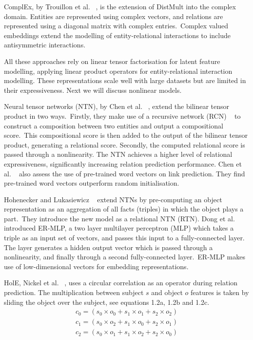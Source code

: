 \noindent ComplEx, by Trouillon et al. \unskip~\citep{trouillon2016complex}, is the extension of DistMult into the complex domain. Entities are represented using complex vectors, and relations are represented using a diagonal matrix with complex entries.\ Complex valued embeddings extend the modelling of entity-relational interactions to include antisymmetric interactions. \par

\noindent All these approaches rely on linear tensor factorisation for latent feature modelling, applying linear product operators for entity-relational interaction modelling. These representations scale well with large datasets but are limited in their expressiveness. Next we will discuss nonlinear models. \par

\noindent Neural tensor networks (NTN), by Chen et al. \unskip~\citep{socher2013reasoning}, extend the bilinear tensor product in two ways.\ Firstly, they make use of a recursive network (RCN) \unskip~\citep{socher2012semantic} to construct a composition between two entities and output a compositional score.\ This compositional score is then added to the output of the bilinear tensor product, generating a relational score. Secondly, the computed relational score is passed through a nonlinearity. The NTN achieves a higher level of relational expressiveness, significantly increasing relation prediction performance.  Chen et al. \unskip~\citep{socher2013reasoning} also assess the use of pre-trained word vectors on link prediction. They find pre-trained word vectors outperform random initialisation. \par

\noindent Hohenecker and Lukasiewicz \unskip~\citep{hohenecker2017deep} extend NTNs by pre-computing an object representation as an aggregation of all facts (triples) in which the object plays a part.\ They introduce the new model as a relational NTN (RTN). Dong et al. \unskip~\citep{dong2014knowledge} introduced ER-MLP, a two layer multilayer perceptron (MLP) which takes a triple as an input set of vectors, and passes this input to a fully-connected layer. The layer generates a hidden output vector which is passed through a nonlinearity, and finally through a second fully-connected layer.\ ER-MLP makes use of low-dimensional vectors for embedding representations. \par

\noindent HolE, Nickel et al. \unskip~\citep{nickel2016holographic}, uses a circular correlation as an operator during relation prediction. The multiplication between subject $ s $ and object $ o $ features is taken by sliding the object over the subject, see equations 1.2a, 1.2b and 1.2c. 
\begin{subequations}
	\begin{gather}
		c_0 =  (s_0 \times o_0 + s_1 \times o_1 + s_2 \times o_2) \\
		c_1 =  (s_0 \times o_2 + s_1 \times o_0 + s_2 \times o_1) \\
		c_2 =  (s_0 \times o_1 + s_1 \times o_2 + s_2 \times o_0) 
	\end{gather}
\end{subequations}

